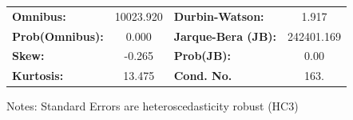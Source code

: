 \begin{center}
\begin{tabular}{lcccccc}
\bottomrule
\end{tabular}
\begin{tabular}{lclc}
\textbf{Omnibus:}       & 10023.920 & \textbf{  Durbin-Watson:     } &     1.917   \\
\textbf{Prob(Omnibus):} &    0.000  & \textbf{  Jarque-Bera (JB):  } & 242401.169  \\
\textbf{Skew:}          &   -0.265  & \textbf{  Prob(JB):          } &      0.00   \\
\textbf{Kurtosis:}      &   13.475  & \textbf{  Cond. No.          } &      163.   \\
\bottomrule
\end{tabular}
\end{center}

Notes: \newline
 [1] Standard Errors are heteroscedasticity robust (HC3)
